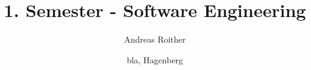 \documentclass[a4papr,12pt]{article}
\begin{document}
%

\newcommand{\wahr}{\text{w}}
\newcommand{\falsch}{\text{f}}

\title{1. Semester - Software Engineering}
\author{Andreas Roither}
\date{bla{}, Hagenberg}
\maketitle
\newpage

\tableofcontents
\newpage

















\end{document}

